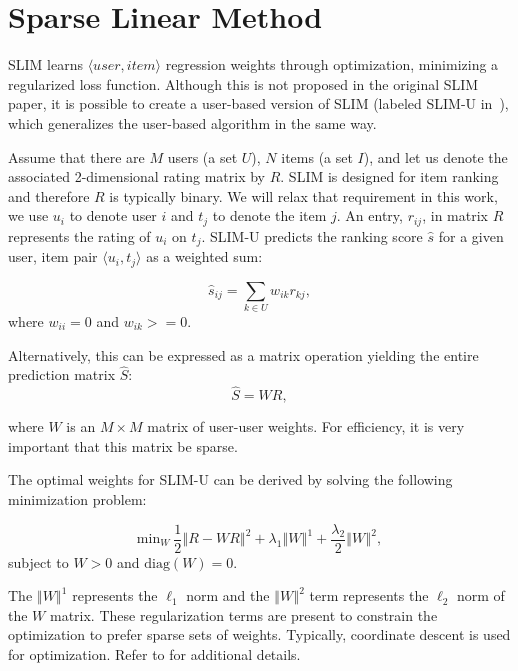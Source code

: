 \section{Sparse Linear Method}

SLIM learns $\langle user, item \rangle$ regression weights through optimization, minimizing a regularized loss function. Although this is not proposed in the original SLIM paper, it is possible to create a user-based version of SLIM (labeled SLIM-U in~\cite{zheng2014cslim}), which generalizes the user-based algorithm in the same way. 

Assume that there are $M$ users (a set $U$), $N$ items (a set $I$), and let us denote the associated 2-dimensional rating matrix by $R$. SLIM is designed for item ranking and therefore $R$ is typically binary. We will relax that requirement in this work, we use $u_i$ to denote user $i$ and $t_j$ to denote the item $j$. An entry, $r_{ij}$, in matrix $R$ represents the rating of $u_i$ on $t_j$. SLIM-U predicts the ranking score $\hat{s}$ for a given user, item pair $\langle u_i, t_j \rangle$ as a weighted sum:

\begin{equation}
    \hat{s}_{ij} = \sum_{k \in U}{w_{ik}r_{kj}}, 
\end{equation}
where $w_{ii} = 0$ and $w_{ik} >= 0$.
\vspace{0.25cm}

Alternatively, this can be expressed as a matrix operation yielding the entire prediction matrix $\hat{S}$:    
\begin{equation}
\hat{S} = WR,
\end{equation}
\vspace{0.25cm}

where $W$ is an $M \times M$ matrix of user-user weights. For efficiency, it is very important that this matrix be sparse.

The optimal weights for SLIM-U can be derived by solving the following minimization problem:

\begin{equation}
\text{min}_W~\frac{1}{2}\left\Vert R - WR \right\Vert^2 + 
    \lambda_1 \left\Vert W \right\Vert^1 +
    \frac{\lambda_2}{2}\left\Vert W \right\Vert^2,   
\end{equation}
subject to $W > 0$  and $\text{diag}(W) = 0$.
\vspace{0.25cm}


The $\left\Vert W \right\Vert^1$ represents the $\ell_1$ norm and the $\left\Vert W \right\Vert^2$ term represents the $\ell_2$ norm of the $W$ matrix. These regularization terms are present to constrain the optimization to prefer sparse sets of weights. Typically, coordinate descent is used for optimization. Refer to \cite{ning2011slim} for additional details. 

